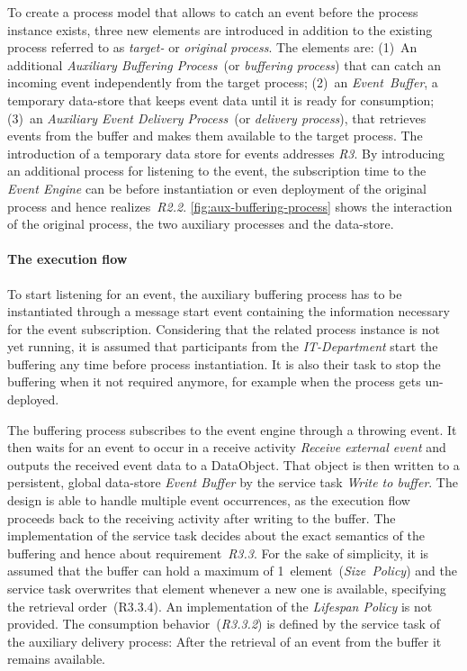 To create a process model that allows to catch an event before the process instance exists, three new elements are introduced in addition to the existing process referred to as \textit{target-} or \textit{original process}. The elements are: (1)~An additional \textit{Auxiliary Buffering Process}~(or \textit{buffering process}) that can catch an incoming event independently from the target process; (2)~an \textit{Event~Buffer}, a temporary data-store that keeps event data until it is ready for consumption; (3)~an \textit{Auxiliary Event Delivery Process}~(or \textit{delivery process}), that retrieves events from the buffer and makes them available to the target process.
The introduction of a temporary data store for events addresses \textit{R3}.
By introducing an additional process for listening to the event, the subscription time to the \textit{Event Engine} can be before instantiation or even deployment of the original process and hence realizes~\textit{R2.2}.
\autoref{fig:aux-buffering-process} shows the interaction of the original process, the two auxiliary processes and the data-store.


\paragraph{The execution flow}
To start listening for an event, the auxiliary buffering process has to be instantiated through a message start event containing the information necessary for the event subscription. Considering that the related process instance is not yet running, it is assumed that participants from the \textit{IT-Department} start the buffering any time before process instantiation.
It is also their task to stop the buffering when it not required anymore, for example when the process gets un-deployed.

The buffering process subscribes to the event engine through a throwing event. It then waits for an event to occur in a receive activity \textit{Receive external event} and outputs the received event data to a DataObject. That object is then written to a persistent, global data-store \textit{Event Buffer} by the service task \textit{Write to buffer}. 
The design is able to handle multiple event occurrences, as the execution flow proceeds back to the receiving activity after writing to the buffer.
The implementation of the service task decides about the exact semantics of the buffering and hence about requirement~\textit{R3.3}. For the sake of simplicity, it is assumed that the buffer can hold a maximum of 1~element~(\textit{Size~Policy}) and the service task overwrites that element whenever a new one is available, specifying the retrieval order~(R3.3.4).
An implementation of the \textit{Lifespan Policy} is not provided. 
The consumption behavior~(\textit{R3.3.2}) is defined by the service task of the auxiliary delivery process: After the retrieval of an event from the buffer it remains available.

